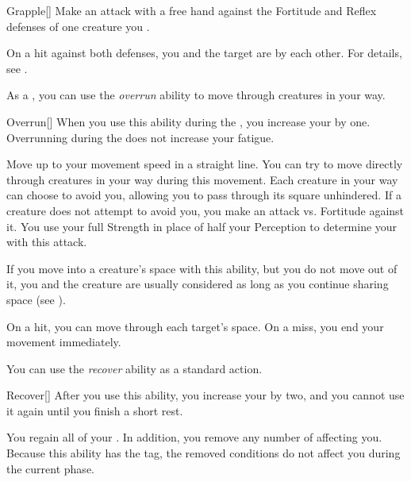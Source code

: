         \begin{activeability}{Grapple}[]
            \rankline
            Make an attack with a free hand against the Fortitude and Reflex defenses of one creature you .

            On a hit against both defenses, you and the target are \grappled by each other.
            For details, see .
        \end{activeability}

        \label{Overrun} As a , you can use the \textit{overrun} ability to move through creatures in your way.

        \begin{activeability}{Overrun}[]
            \rankline
            When you use this ability during the , you increase your  by one.
            Overrunning during the  does not increase your fatigue.

            Move up to your movement speed in a straight line.
            You can try to move directly through creatures in your way during this movement.
            Each creature in your way can choose to avoid you, allowing you to pass through its square unhindered.
            If a creature does not attempt to avoid you, you make an attack vs. Fortitude against it.
            You use your full Strength in place of half your Perception to determine your  with this attack.

            If you move into a creature's space with this ability, but you do not move out of it, you and the creature are usually considered \squeezing as long as you continue sharing space (see ).

            On a hit, you can move through each target's space.
            On a miss, you end your movement immediately.
        \end{activeability}

        \label{Recover} You can use the \textit{recover} ability as a standard action.
        \begin{activeability}{Recover}[]
            \rankline
            After you use this ability, you increase your  by two, and you cannot use it again until you finish a short rest.

            You regain all of your .
            In addition, you remove any number of  affecting you.
            Because this ability has the  tag, the removed conditions do not affect you during the current phase.
        \end{activeability}

